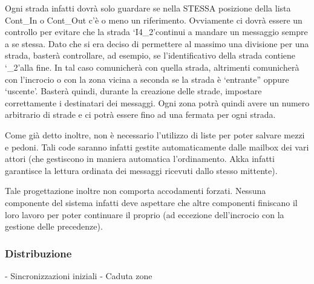 \documentclass{article}
\begin{document}
Ogni strada infatti dovr\`{a} solo guardare se nella STESSA posizione della lista Cont\_In o Cont\_Out c\textquoteright{}\`{e} o meno un riferimento. Ovviamente ci dovr\`{a} essere un controllo per evitare che la strada \lq I4\_2\rq continui a mandare un messaggio sempre a se stessa. Dato che si era deciso di permettere al massimo una divisione per una strada, baster\`{a} controllare, ad esempio, se l\textquoteright{}identificativo della strada contiene \lq \_2\rq  alla fine. In tal caso comunicher\`{a} con quella strada, altrimenti comunicher\`{a} con l\textquoteright{}incrocio o con la zona vicina a seconda se la strada \`{e} \lq entrante” oppure \lq uscente\rq. Baster\`{a} quindi, durante la creazione delle strade,  impostare correttamente i destinatari dei messaggi. Ogni zona potr\`{a} quindi avere un numero arbitrario di strade e ci potr\`{a} essere fino ad una fermata per ogni strada.
\par Come gi\`{a} detto inoltre, non \`{e} necessario l\textquoteright{}utilizzo di liste per poter salvare mezzi e pedoni. Tali code saranno infatti gestite automaticamente dalle mailbox dei vari attori (che gestiscono in maniera automatica l\textquoteright{}ordinamento. Akka infatti garantisce la lettura ordinata dei messaggi ricevuti dallo stesso mittente). 
\par Tale progettazione inoltre non comporta accodamenti forzati. Nessuna componente del sistema infatti deve aspettare che altre componenti finiscano il loro lavoro per poter continuare il proprio (ad eccezione dell\textquoteright{}incrocio con la gestione delle precedenze). 


\subsubsection{Distribuzione}
- Sincronizzazioni iniziali \newline
- Caduta zone \newline
\end{document}
